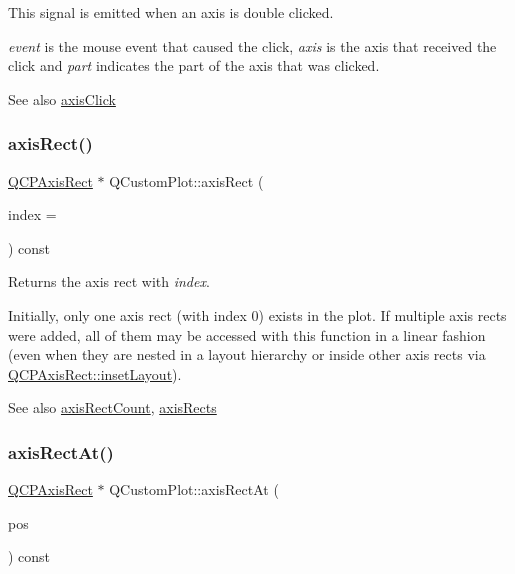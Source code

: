 This signal is emitted when an axis is double clicked.

{\itshape event} is the mouse event that caused the click, {\itshape axis} is the axis that received the click and {\itshape part} indicates the part of the axis that was clicked.

\begin{DoxySeeAlso}{See also}
\mbox{\hyperlink{class_q_custom_plot_abf635f8b56ab5c16d5de9f358543e82b}{axis\+Click}} 
\end{DoxySeeAlso}
\mbox{\label{class_q_custom_plot_ae5eefcb5f6ca26689b1fd4f6e25b42f9}} 
\subsubsection{\texorpdfstring{axis\+Rect()}{axisRect()}}
{\footnotesize\ttfamily \mbox{\hyperlink{class_q_c_p_axis_rect}{Q\+C\+P\+Axis\+Rect}} $\ast$ Q\+Custom\+Plot\+::axis\+Rect (\begin{DoxyParamCaption}\item[{int}]{index = {} }\end{DoxyParamCaption}) const}

Returns the axis rect with {\itshape index}.

Initially, only one axis rect (with index 0) exists in the plot. If multiple axis rects were added, all of them may be accessed with this function in a linear fashion (even when they are nested in a layout hierarchy or inside other axis rects via \mbox{\hyperlink{class_q_c_p_axis_rect_a949f803466619924c7018df4b511ae10}{Q\+C\+P\+Axis\+Rect\+::inset\+Layout}}).

\begin{DoxySeeAlso}{See also}
\mbox{\hyperlink{class_q_custom_plot_a8f85940aaac50efb466287d9d2d04ec6}{axis\+Rect\+Count}}, \mbox{\hyperlink{class_q_custom_plot_a12af771429e2d7e313c8c5d5fca068fe}{axis\+Rects}} 
\end{DoxySeeAlso}
\mbox{\label{class_q_custom_plot_a4a08842fc3e9ba6bed83aa410c5c5ba5}} 
\subsubsection{\texorpdfstring{axis\+Rect\+At()}{axisRectAt()}}
{\footnotesize\ttfamily \mbox{\hyperlink{class_q_c_p_axis_rect}{Q\+C\+P\+Axis\+Rect}} $\ast$ Q\+Custom\+Plot\+::axis\+Rect\+At (\begin{DoxyParamCaption}\item[{const Q\+PointF \&}]{pos }\end{DoxyParamCaption}) const}

